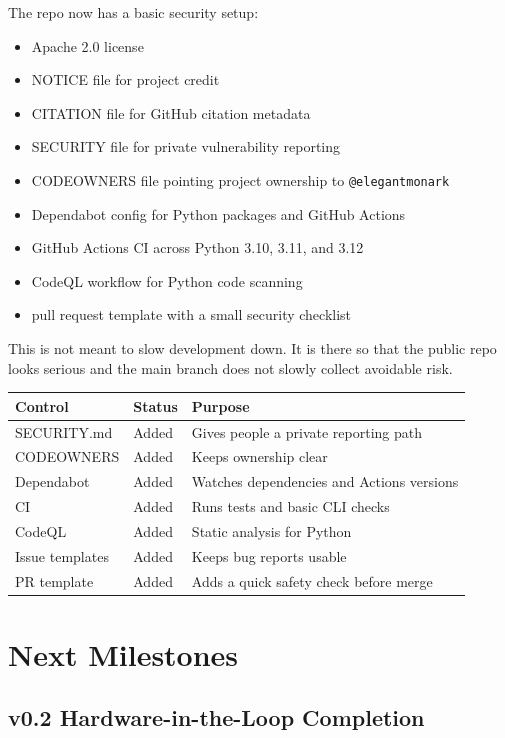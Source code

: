 \documentclass[11pt,a4paper]{article}
\begin{document}
The repo now has a basic security setup:

\begin{itemize}[leftmargin=*]
  \item Apache 2.0 license
  \item NOTICE file for project credit
  \item CITATION file for GitHub citation metadata
  \item SECURITY file for private vulnerability reporting
  \item CODEOWNERS file pointing project ownership to \texttt{@elegantmonark}
  \item Dependabot config for Python packages and GitHub Actions
  \item GitHub Actions CI across Python 3.10, 3.11, and 3.12
  \item CodeQL workflow for Python code scanning
  \item pull request template with a small security checklist
\end{itemize}

This is not meant to slow development down. It is there so that the public repo looks serious and the main branch does not slowly collect avoidable risk.

\begin{longtable}{lll}
\toprule
Control & Status & Purpose \\
\midrule
SECURITY.md & Added & Gives people a private reporting path \\
CODEOWNERS & Added & Keeps ownership clear \\
Dependabot & Added & Watches dependencies and Actions versions \\
CI & Added & Runs tests and basic CLI checks \\
CodeQL & Added & Static analysis for Python \\
Issue templates & Added & Keeps bug reports usable \\
PR template & Added & Adds a quick safety check before merge \\
\bottomrule
\end{longtable}

\section{Next Milestones}

\subsection{v0.2 Hardware-in-the-Loop Completion}
\end{document}
